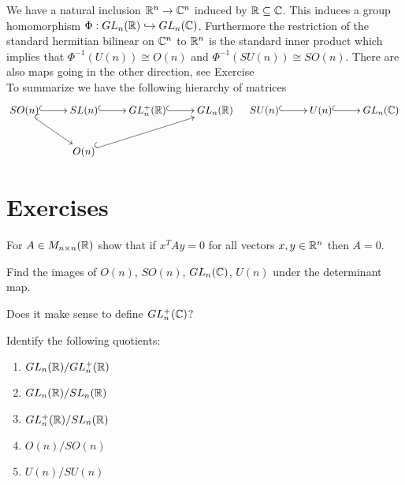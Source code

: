 We have a natural inclusion $\mathbb{R}^n \rightarrow \mathbb{C}^n$ induced by $\mathbb{R} \subseteq \mathbb{C}$. This induces a group homomorphism $\Phi: GL_n(\mathbb{R}) \hookrightarrow GL_n(\mathbb{C})$. Furthermore the restriction of the standard hermitian bilinear on $\mathbb{C}^n$ to $\mathbb{R}^n$ is the standard inner product which implies that $\Phi^{-1}(U(n)) \cong O(n)$ and $\Phi^{-1}(SU(n)) \cong SO(n)$. There are also maps going in the other direction, see Exercise \\




To summarize we have the following hierarchy of matrices
\begin{align*}
	\xymatrix{
	SO(n) \ar@{^{(}->}[r] \ar@{^{(}->}[dr] & SL(n) \ar@{^{(}->}[r] & GL_n^+(\R) \ar@{^{(}->}[r] & GL_n(\R) \\
	& O(n) \ar@{^{(}->}[urr]
	}
	&&
	\xymatrix{
	SU(n) \ar@{^{(}->}[r] & U(n) \ar@{^{(}->}[r] & GL_n(\C)
	}
\end{align*}











\section{Exercises}

\begin{exercise}
	\label{thm:linAlgProb}
	For $A \in M_{n \times n}(\mathbb{R})$ show that if $ x^T A  y = 0$ for all vectors $ x,  y \in \mathbb{R}^n$ then $A = 0$.
\end{exercise}

\begin{exercise}
	\label{thm:detProb}
	Find the images of $O(n)$, $SO(n)$, $GL_n(\mathbb{C})$, $U(n)$ under the determinant map.
\end{exercise}

\begin{exercise}
	Does it make sense to define $GL_n^+(\mathbb{C})$?
\end{exercise}

\begin{exercise}
	Identify the following quotients:
	\begin{enumerate}
		\item $GL_n(\mathbb{R})/GL_n^+(\mathbb{R})$
		\item $GL_n(\mathbb{R})/SL_n(\mathbb{R})$
		\item $GL^+_n(\mathbb{R})/SL_n(\mathbb{R})$
		\item $O(n)/SO(n)$
		\item $U(n)/SU(n)$
	\end{enumerate}
\end{exercise}

